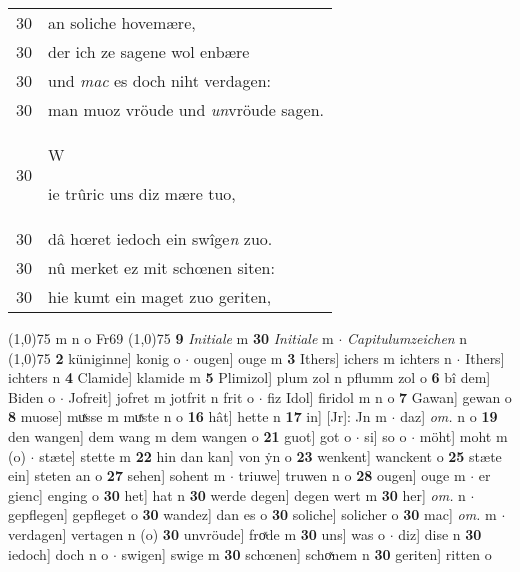\documentclass[8pt,a4paper,notitlepage]{article}
\begin{document}
\begin{table}[ht]
\begin{minipage}[t]{0.5\linewidth}
\begin{tabular}{rl}
30 & an soliche hovemære,\\ 
30 & der ich ze sagene wol enbære\\ 
30 & und \textit{mac} es doch niht verdagen:\\ 
30 & man muoz vröude und \textit{un}vröude sagen.\\ 
30 & \begin{large}W\end{large}ie trûric uns diz mære tuo,\\ 
30 & dâ hœret iedoch ein swîge\textit{n} zuo.\\ 
30 & nû merket ez mit schœnen siten:\\ 
30 & hie kumt ein maget zuo geriten,\\ 
\end{tabular}
\scriptsize
\line(1,0){75} \newline
m n o Fr69 \newline
\line(1,0){75} \newline
\textbf{9} \textit{Initiale} m  \textbf{30} \textit{Initiale} m   $\cdot$ \textit{Capitulumzeichen} n  \newline
\line(1,0){75} \newline
\textbf{2} küniginne] konig o  $\cdot$ ougen] ouge m \textbf{3} Ithers] ichers m ichters n  $\cdot$ Ithers] ichters n \textbf{4} Clamide] klamide m \textbf{5} Plimizol] plum zol n pflumm zol o \textbf{6} bî dem] Biden o  $\cdot$ Jofreit] jofret m jotfrit n frit o  $\cdot$ fiz Idol] firidol m n o \textbf{7} Gawan] gewan o \textbf{8} muose] muͯsse m muͯste n o \textbf{16} hât] hette n \textbf{17} in] [Jr]: Jn m  $\cdot$ daz] \textit{om.} n o \textbf{19} den wangen] dem wang m dem wangen o \textbf{21} guot] got o  $\cdot$ si] so o  $\cdot$ möht] moht m (o)  $\cdot$ stæte] stette m \textbf{22} hin dan kan] von ẏn o \textbf{23} wenkent] wanckent o \textbf{25} stæte ein] steten an o \textbf{27} sehen] sohent m  $\cdot$ triuwe] truwen n o \textbf{28} ougen] ouge m  $\cdot$ er gienc] enging o \textbf{30} het] hat n \textbf{30} werde degen] degen wert m \textbf{30} her] \textit{om.} n  $\cdot$ gepflegen] gepfleget o \textbf{30} wandez] dan es o \textbf{30} soliche] solicher o \textbf{30} mac] \textit{om.} m  $\cdot$ verdagen] vertagen n (o) \textbf{30} unvröude] froͯde m \textbf{30} uns] was o  $\cdot$ diz] dise n \textbf{30} iedoch] doch n o  $\cdot$ swigen] swige m \textbf{30} schœnen] schoͯnem n \textbf{30} geriten] ritten o \newline
\end{minipage}
\end{table}
\end{document}
